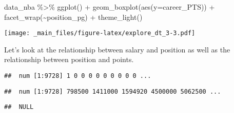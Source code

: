 \documentclass[
]{book}
\newenvironment{Shaded}{\begin{snugshade}}{\end{snugshade}}
\newcommand{\AttributeTok}[1]{\textcolor[rgb]{0.77,0.63,0.00}{#1}}
\newcommand{\FunctionTok}[1]{\textcolor[rgb]{0.00,0.00,0.00}{#1}}
\newcommand{\NormalTok}[1]{#1}
\newcommand{\SpecialCharTok}[1]{\textcolor[rgb]{0.00,0.00,0.00}{#1}}
\begin{document}
\begin{Shaded}
\begin{Highlighting}[]
\NormalTok{data\_nba }\SpecialCharTok{\%\textgreater{}\%} \FunctionTok{ggplot}\NormalTok{() }\SpecialCharTok{+} 
\FunctionTok{geom\_boxplot}\NormalTok{(}\FunctionTok{aes}\NormalTok{(}\AttributeTok{y=}\NormalTok{career\_PTS)) }\SpecialCharTok{+}
  \FunctionTok{facet\_wrap}\NormalTok{(}\SpecialCharTok{\textasciitilde{}}\NormalTok{position\_pg) }\SpecialCharTok{+}
  \FunctionTok{theme\_light}\NormalTok{()}
\end{Highlighting}
\end{Shaded}

\texttt{[image: \_main\_files/figure-latex/explore\_dt\_3-3.pdf]}

Let's look at the relationship between salary and position as well as the
relationship between position and points.

\begin{Shaded}
\end{Shaded}

\begin{verbatim}
##  num [1:9728] 1 0 0 0 0 0 0 0 0 0 ...
\end{verbatim}

\begin{Shaded}
\end{Shaded}

\begin{verbatim}
##  num [1:9728] 798500 1411000 1594920 4500000 5062500 ...
\end{verbatim}

\begin{Shaded}
\end{Shaded}

\begin{verbatim}
##  NULL
\end{verbatim}
\end{document}
